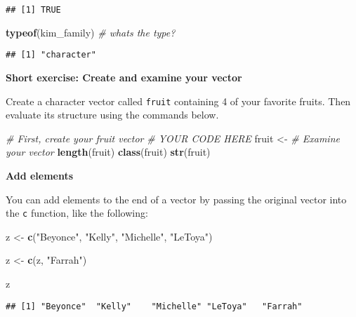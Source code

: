 \documentclass[
]{book}
\newenvironment{Shaded}{\begin{snugshade}}{\end{snugshade}}
\newcommand{\CommentTok}[1]{\textcolor[rgb]{0.56,0.35,0.01}{\textit{#1}}}
\newcommand{\KeywordTok}[1]{\textcolor[rgb]{0.13,0.29,0.53}{\textbf{#1}}}
\newcommand{\NormalTok}[1]{#1}
\newcommand{\StringTok}[1]{\textcolor[rgb]{0.31,0.60,0.02}{#1}}
\begin{document}
\begin{verbatim}
## [1] TRUE
\end{verbatim}

\begin{Shaded}
\begin{Highlighting}[]
\KeywordTok{typeof}\NormalTok{(kim\_family) }\CommentTok{\# what\textquotesingle{}s the type?}
\end{Highlighting}
\end{Shaded}

\begin{verbatim}
## [1] "character"
\end{verbatim}

\textbf{Short exercise: Create and examine your vector}

Create a character vector called \texttt{fruit} containing 4 of your favorite fruits. Then evaluate its structure using the commands below.

\begin{Shaded}
\begin{Highlighting}[]
\CommentTok{\# First, create your fruit vector}
\CommentTok{\# YOUR CODE HERE}
\NormalTok{fruit \textless{}{-}}
\StringTok{  }\CommentTok{\# Examine your vector}
\StringTok{  }\KeywordTok{length}\NormalTok{(fruit)}
\KeywordTok{class}\NormalTok{(fruit)}
\KeywordTok{str}\NormalTok{(fruit)}
\end{Highlighting}
\end{Shaded}

\textbf{Add elements}

You can add elements to the end of a vector by passing the original vector into the \texttt{c} function, like the following:

\begin{Shaded}
\begin{Highlighting}[]
\NormalTok{z \textless{}{-}}\StringTok{ }\KeywordTok{c}\NormalTok{(}\StringTok{"Beyonce"}\NormalTok{, }\StringTok{"Kelly"}\NormalTok{, }\StringTok{"Michelle"}\NormalTok{, }\StringTok{"LeToya"}\NormalTok{)}

\NormalTok{z \textless{}{-}}\StringTok{ }\KeywordTok{c}\NormalTok{(z, }\StringTok{"Farrah"}\NormalTok{)}

\NormalTok{z}
\end{Highlighting}
\end{Shaded}

\begin{verbatim}
## [1] "Beyonce"  "Kelly"    "Michelle" "LeToya"   "Farrah"
\end{verbatim}
\end{document}
